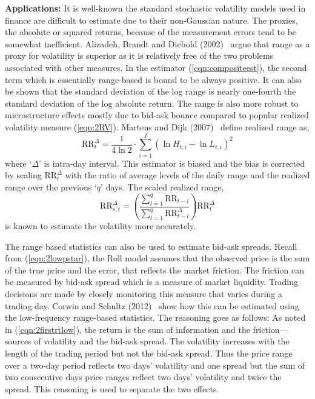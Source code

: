 \noindent\textbf{Applications:} It is well-known the standard stochastic volatility models used in finance are difficult to estimate due to their non-Gaussian nature. The proxies, the absolute or squared returns, because of the measurement errors tend to be somewhat inefficient. Alizadeh, Brandt and Diebold (2002)~\cite{diebold} argue that range as a proxy for volatility is superior as it is relatively free of the two problems associated with other measures. In the estimator (\ref{eqn:compositeest}), the second term which is essentially range-based is bound to be always positive. It can also be shown that the standard deviation of the log range is nearly one-fourth the standard deviation of the log absolute return. The range is also more robust to microstructure effects mostly due to bid-ask bounce compared to popular realized volatility measure (\ref{eqn:2RV}). Martens and Dijk (2007)~\cite{dijk} define realized range as,
	\begin{equation}\label{eqn:rrtdelta}
	\text{RR}_t^\Delta= \dfrac{1}{4\ln 2} \cdot \sum_{i=1}^I (\ln H_{t,i} - \ln L_{t,i})^2
	\end{equation}
where `$\Delta$' is intra-day interval. This estimator is biased and the bias is corrected by scaling $\text{RR}_t^\Delta$ with the ratio of average levels of the daily range and the realized range over the previous `$q$' days. The scaled realized range,
	\begin{equation}\label{eqn:rrstdelta}
	\text{RR}_{s,t}^\Delta= \left(\dfrac{\sum_{l=1}^q \text{RR}_{t-l}}{\sum_{l=1}^q \text{RR}_{t-l}^\Delta} \right) \text{RR}_t^\Delta
	\end{equation}
is known to estimate the volatility more accurately. 


The range based statistics can also be used to estimate bid-ask spreads. Recall from (\ref{eqn:2lowpstar}), the Roll model assumes that the observed price is the sum of the true price and the error, that reflects the market friction. The friction can be measured by bid-ask spread which is a measure of market liquidity. Trading decisions are made by closely monitoring this measure that varies during a trading day. Corwin and Schultz (2012)~\cite{schultz12} show how this can be estimated using the low-frequency range-based statistics. The reasoning goes as follows: As noted in (\ref{eqn:2firstrtlow}), the return is the sum of information and the friction---sources of volatility and the bid-ask spread. The volatility increases with the length of the trading period but not the bid-ask spread. Thus the price range over a two-day period reflects two days' volatility and one spread but the sum of two consecutive days price ranges reflect two days' volatility and twice the spread. This reasoning is used to separate the two effects.


